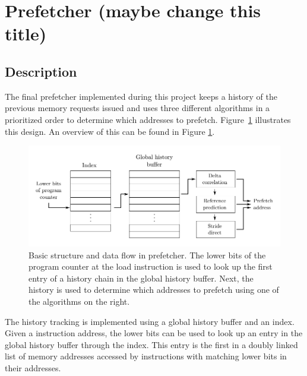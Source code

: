 \section{Prefetcher (maybe change this title)}
\label{sec:prefetcher}
\subsection{Description}

The final prefetcher implemented during this project keeps a history of the
previous memory requests issued and uses three different algorithms in a
prioritized order to determine which addresses to prefetch.
Figure~\ref{fig:prefetcher} illustrates this design.
An overview of this can be found in Figure \ref{fig:prefetcher}.

\begin{figure}[h]
	\centering
	\includegraphics{images/prefetcher.pdf}
	\caption{
		Basic structure and data flow in prefetcher. The lower bits of the
		program counter at the load instruction is used to look up the first
		entry of a history chain in the global history buffer. Next, the history
		is used to determine which addresses to prefetch using one of the
		algorithms on the right.
	}
	\label{fig:prefetcher}
\end{figure}

The history tracking is implemented using a global history buffer and an index.
Given a instruction address, the lower bits can be used to look up an entry in
the global history buffer through the index.
This entry is the first in a doubly linked list of memory addresses accessed by
instructions with matching lower bits in their addresses.

